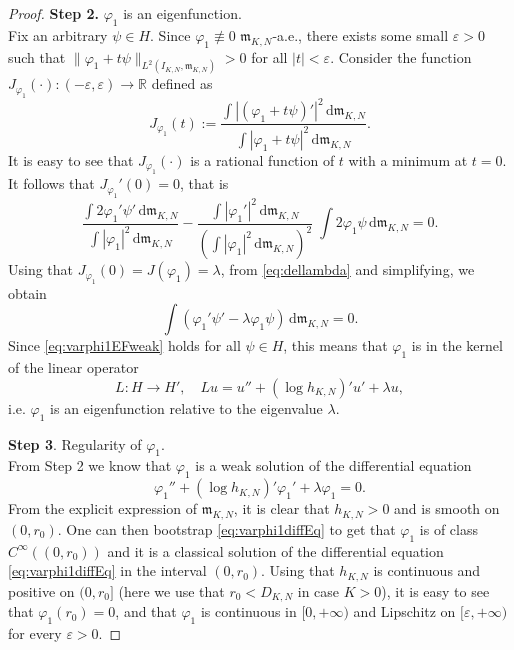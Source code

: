 \documentclass[12pt]{article}
\newcommand{\R}{\mathbb{R}}
\newcommand{\dd}{\mathrm{d}}
\newcommand{\mm}{\mathfrak m}
\theoremstyle{plain}
\theoremstyle{definition}
\begin{document}
\begin{proof}
 \textbf{Step 2.}  $\varphi_1$ is an eigenfunction.
\\ Fix an arbitrary $\psi\in H$. Since $\varphi_1\not \equiv 0$ $\mm_{K,N}$-a.e., there exists some small $\varepsilon>0$ such that $\|\varphi_1+t \psi\|_{L^2(I_{K,N},\mm_{K,N})}>0$ for all $|t|<\varepsilon$. Consider the function
$J_{\varphi_1}(\cdot):(-\varepsilon, \varepsilon)\to \R$ defined as
\begin{equation}\label{eq:defJ1}
J_{\varphi_1}(t):= \frac{\int |(\varphi_1+t\psi)'|^2 \,  \dd \mm_{K,N}}{ \int |\varphi_1+t\psi|^2 \,  \dd \mm_{K,N} }.
\end{equation}
It is easy to see that $J_{\varphi_1}(\cdot)$ is a rational function of $t$ with a minimum at $t=0$. It follows that $J_{\varphi_1}'(0)=0$, that is
$$
\frac{\int 2 \varphi_1'  \psi'  \,  \dd \mm_{K,N}}{ \int |\varphi_1|^2 \,  \dd \mm_{K,N}} - \frac{\int |\varphi_1'|^2 \,  \dd \mm_{K,N} } { \left(\int |\varphi_1|^2 \,  \dd \mm_{K,N}\right)^2} \; \int 2 \varphi_1 \psi  \,  \dd \mm_{K,N}=0.
$$
Using that $J_{\varphi_1}(0)=J(\varphi_1)=\lambda$, from \eqref{eq:dellambda} and simplifying, we obtain
\begin{equation}\label{eq:varphi1EFweak}
\int \left(\varphi_1' \psi'- \lambda \varphi_1 \psi \right) \, \dd \mm_{K,N}=0.
\end{equation}
Since \eqref{eq:varphi1EFweak} holds for all $\psi\in H$, this means that $\varphi_1$ is in the kernel of the linear operator
\begin{equation}
L: H\to H', \quad Lu= u''+ (\log h_{K,N})' u' + \lambda u,
\end{equation}
i.e. $\varphi_1$ is an eigenfunction relative to the eigenvalue $\lambda$.
\medskip

 \textbf{Step 3}. Regularity of  $\varphi_1$.
 \\From Step 2 we know that $\varphi_1$ is a weak solution of the differential equation
 \begin{equation}\label{eq:varphi1diffEq}
 \varphi_1''+ (\log h_{K,N})' \varphi_1' + \lambda \varphi_1=0.
 \end{equation}
 From the explicit expression of $\mm_{K,N}$,  it is clear that $h_{K,N}>0$ and is smooth on $(0,r_0)$. One can then bootstrap \eqref{eq:varphi1diffEq} to get that $\varphi_1$ is of class $C^\infty((0,r_0))$ and it is a classical solution of the differential equation \eqref{eq:varphi1diffEq} in the interval $(0,r_0)$. Using that  $h_{K,N}$ is continuous and positive on $(0,r_0]$ (here we use that $r_0<D_{K,N}$ in case $K>0$), it is easy to see that  $\varphi_1(r_0)=0$, and that $\varphi_1$ is continuous in $[0,+\infty)$ and Lipschitz on $[\varepsilon, +\infty)$ for every $\varepsilon>0$.
 \medskip


\end{proof}
\end{document}
